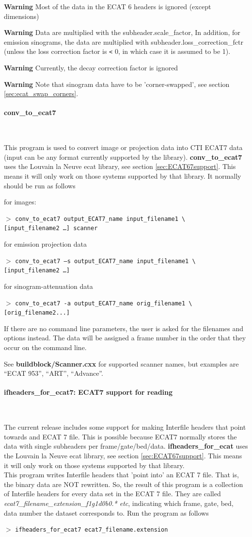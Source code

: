 \documentclass{article}
\newcommand{\tab}{\hspace{5mm}}
\newcommand{\subsubsubsection}[1]{\paragraph{#1}\mbox{} \\}
\newcommand{\cmdline}[1]{\par \noindent $>$ \texttt{#1}\par}
\begin{document}
{{\textbf{Warning} Most of the data in the ECAT 6 headers is ignored 
(except dimensions)


\textbf{Warning} Data are multiplied with the subheader.scale\_factor, 
In addition, for emission sinograms, the data are multiplied 
with subheader.loss\_correction\_fctr (unless the loss correction 
factor is \texttt{<} 0, in which case it is assumed to be 1).


\textbf{Warning} Currently, the decay correction factor is ignored 

\textbf{Warning} Note that sinogram data have to be 'corner-swapped', 
see section \ref{sec:ecat_swap_corners}.

{ \subsubsubsection{conv\_to\_ecat7}
}
This program is used to convert image or projection data into 
CTI ECAT7 data (input can be any format currently supported by 
the library). \textbf{conv\_to\_ecat7} uses the Louvain la Neuve ecat 
library, see section \ref{sec:ECAT67support}. This means it will only work on those 
systems supported by that library. It normally should be run 
as follows


for images:
\cmdline{conv\_to\_ecat7 output\_ECAT7\_name input\_filename1 {\textbackslash}\\
{[}input\_filename2 \dots ] scanner}


for emission projection data
\cmdline{conv\_to\_ecat7 --s output\_ECAT7\_name input\_filename1 {\textbackslash}\\
{[}input\_filename2 \dots ]\tab  }


for sinogram-attenuation data
\cmdline{conv\_to\_ecat7 -a output\_ECAT7\_name orig\_filename1 {\textbackslash}\\
{[}orig\_filename2...]}


If there are no command line parameters, the user is asked for 
the filenames and options instead. The data will be assigned 
a frame number in the order that they occur on the command line.


See \textbf{buildblock/Scanner.cxx} for supported scanner names, but 
examples are ``ECAT 953'', ``ART'', ``Advance''. 


{ \subsubsubsection{ifheaders\_for\_ecat7: ECAT7 support for reading}
}
The current release includes some support for making Interfile 
headers that point towards and ECAT 7 file. This is possible 
because ECAT7 normally stores the data with single subheaders 
per frame/gate/bed/data. \textbf{ifheaders\_for\_ecat} uses the Louvain 
la Neuve ecat library, see section \ref{sec:ECAT67support}. 
This means it will only work on those systems 
supported by that library. \\
This program writes Interfile headers that 'point into' an ECAT 
7 file. That is, the binary data are NOT rewritten. So, the result 
of this program is a collection of Interfile headers for every 
data set in the ECAT 7 file. They are called \textit{ecat7\_filename\_extension\_f1g1d0b0.* 
etc}, indicating which frame, gate, bed, data number the dataset 
corresponds to. Run the program as follows
\cmdline{ifheaders\_for\_ecat7 ecat7\_filename.extension}


}}
\end{document}
